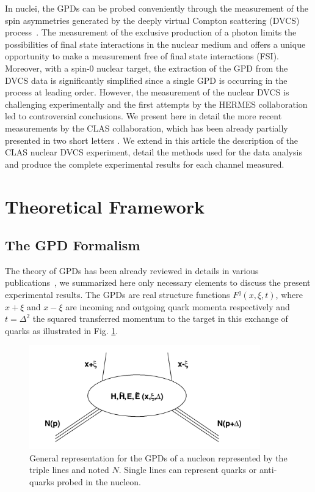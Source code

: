 \documentclass{article}
\begin{document}
In nuclei, the GPDs can be probed conveniently through the measurement of the
spin asymmetries generated by the deeply virtual Compton scattering (DVCS) 
process~\cite{Diehl:2003ny,Belitsky:2005qn,Boffi:2007yc,Guidal:2013rya}. The measurement of the exclusive
production of a photon limits the possibilities of final state interactions in the nuclear 
medium and offers a unique opportunity to make a measurement free of final state interactions 
(FSI). Moreover, with a spin-0 nuclear target, the extraction of the GPD from the DVCS data 
is significantly simplified since a single GPD is occurring in the process at leading order. However, the 
measurement of the nuclear DVCS is challenging experimentally and the first attempts by 
the HERMES collaboration \cite{Airapetian:2009cga} led to controversial conclusions. We present here
in detail the more recent measurements by the CLAS collaboration, which has been already partially presented
in two short letters \cite{Hattawy:2017woc,Hattawy:2018liu}. We extend in this article 
the description of the CLAS nuclear DVCS experiment, detail the methods used for the
data analysis and produce the complete experimental results for each channel measured.


\section{Theoretical Framework}

\subsection{The GPD Formalism}

The theory of GPDs has been already reviewed in details in various 
publications~\cite{Diehl:2003ny,Belitsky:2005qn,Boffi:2007yc,Guidal:2013rya},
we summarized here only necessary elements to discuss the present experimental results.
The GPDs are real structure functions $F^{q}(x,\xi,t)$, where $x+\xi$ and $x-\xi$ are incoming and outgoing quark momenta 
respectively and $t=\Delta^2$ the squared transferred momentum to the target in this exchange of quarks as illustrated in 
Fig. \ref{fig:GPD}. 

\begin{figure}[tbp!]
\center
\includegraphics[width=10.0cm]{fig1/GPD.png}
\caption{General representation for the GPDs of a nucleon represented by the triple lines and noted $N$.
	Single lines can represent quarks or anti-quarks probed in the nucleon.}
\label{fig:GPD}
\end{figure}
\end{document}
